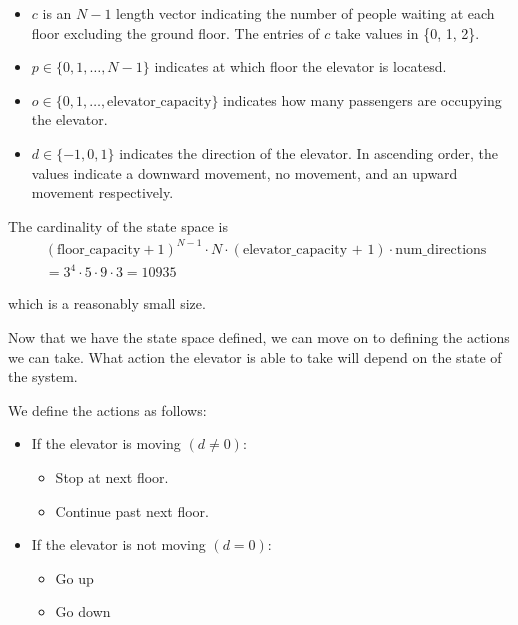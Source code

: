 \begin{itemize}
    \item $c$ is an $N-1$ length vector indicating the number of people waiting at each floor excluding the ground floor. The entries of $c$ take values in \{0, 1, 2\}.
    \item $p \in \{0, 1, \dots, N-1\}$ indicates at which floor the elevator is locatesd.
    \item $o \in \{0, 1, \dots, \text{elevator\_capacity}\}$ indicates how many passengers are occupying the elevator.
    \item $d \in \{-1, 0, 1\}$ indicates the direction of the elevator. In ascending order, the values indicate a downward movement, no movement, and an upward movement respectively.
\end{itemize}

The cardinality of the state space is 
\begin{align*}
    &(\text{floor\_capacity} + 1)^{N - 1} \cdot N \cdot (\text{elevator\_capacity + 1}) \cdot \text{num\_directions}\\
    & = 3 ^ {4} \cdot 5 \cdot 9 \cdot 3 = 10935
\end{align*}

which is a reasonably small size.

Now that we have the state space defined, we can move on to defining the actions we can take. What action the elevator is able to take will depend on the state of the system.

We define the actions as follows:

\begin{itemize}
    \item If the elevator is moving $(d \neq 0)$:
        \begin{itemize}
            \item Stop at next floor.
            \item Continue past next floor.
        \end{itemize}

    \item If the elevator is not moving $(d = 0)$:
        \begin{itemize}
            \item Go up
            \item Go down
        \end{itemize}
\end{itemize}

